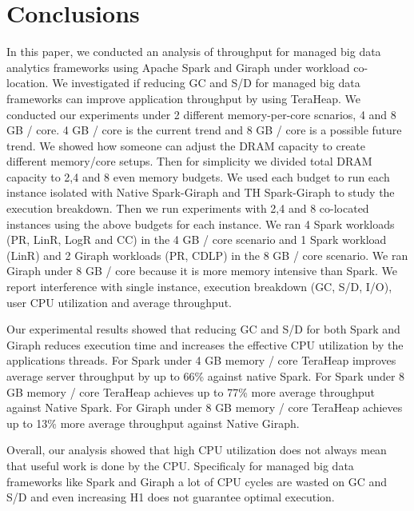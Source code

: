 \section{Conclusions}

In this paper, we conducted an analysis of throughput for managed big data analytics frameworks
using Apache Spark and Giraph under workload co-location. We investigated if reducing GC and S/D for managed big data frameworks can improve application throughput by using TeraHeap. We conducted our experiments under 2 different memory-per-core
scnarios, 4 and 8 GB / core. 4 GB / core is the current trend and 8 GB / core is a possible future trend. 
We showed how someone can adjust the DRAM capacity to create different memory/core setups.
Then for simplicity we divided total DRAM capacity to 2,4 and 8 even memory budgets. We used each budget to run each instance isolated with Native Spark-Giraph and TH Spark-Giraph to study the execution breakdown.
Then we run experiments with 2,4 and 8 co-located instances using the above budgets for each instance. We ran 4 Spark workloads (PR, LinR, LogR and CC) in the 4 GB / core scenario and 1 Spark workload (LinR) and 2 Giraph workloads (PR, CDLP) in the 8 GB / core scenario. We ran Giraph under 8 GB / core because it is more memory intensive than Spark. We report interference with single instance, execution breakdown (GC, S/D, I/O), user CPU utilization and average throughput.

Our experimental results showed that reducing GC and S/D for both Spark and Giraph reduces execution time and increases the effective CPU utilization by the applications threads. 
For Spark under 4 GB memory / core TeraHeap improves average server throughput by up to 66\% against native Spark.
For Spark under 8 GB memory / core TeraHeap achieves up to 77\% more average throughput against Native Spark.
For Giraph under 8 GB memory / core TeraHeap achieves up to 13\% more average throughput against Native Giraph. 

Overall, our analysis showed that high CPU utilization does not always mean that useful work is done by the CPU. Specificaly for managed
big data frameworks like Spark and Giraph a lot of CPU cycles are wasted on GC and S/D and even increasing H1 does not guarantee optimal execution.

